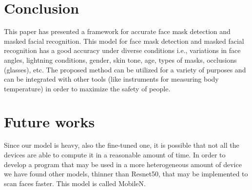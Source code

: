 \section{Conclusion} 

This paper has presented a framework for accurate face mask detection and masked facial recognition.
This model for face mask detection and masked facial recognition has a good accuracy under diverse conditions i.e., variations in face angles,
lightning conditions, gender, skin tone, age, types of masks, occlusions (glasses), etc. 
The proposed method can be utilized for a variety of purposes and can be integrated with other tools (like instruments for measuring body temperature) in order to maximize the safety of people. 

\section{Future works}
Since our model is heavy, also the fine-tuned one, it is possible that not all the devices are able to compute it in a reasonable amount of time. In order to develop a program that may be used in a more heterogeneous amount of device we have found other models, thinner than Resnet50, that may be implemented to scan faces faster. This model is called MobileN.

